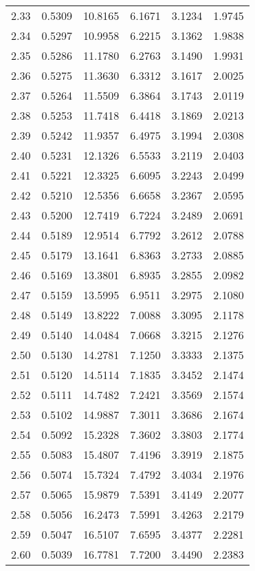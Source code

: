 \documentclass{article}
\begin{document}
\begin{longtable}{cccccc}
2.33 & 0.5309 & 10.8165 & 6.1671 & 3.1234 & 1.9745 \\
2.34 & 0.5297 & 10.9958 & 6.2215 & 3.1362 & 1.9838 \\
2.35 & 0.5286 & 11.1780 & 6.2763 & 3.1490 & 1.9931 \\
2.36 & 0.5275 & 11.3630 & 6.3312 & 3.1617 & 2.0025 \\
2.37 & 0.5264 & 11.5509 & 6.3864 & 3.1743 & 2.0119 \\
2.38 & 0.5253 & 11.7418 & 6.4418 & 3.1869 & 2.0213 \\
2.39 & 0.5242 & 11.9357 & 6.4975 & 3.1994 & 2.0308 \\
2.40 & 0.5231 & 12.1326 & 6.5533 & 3.2119 & 2.0403 \\
2.41 & 0.5221 & 12.3325 & 6.6095 & 3.2243 & 2.0499 \\
2.42 & 0.5210 & 12.5356 & 6.6658 & 3.2367 & 2.0595 \\
2.43 & 0.5200 & 12.7419 & 6.7224 & 3.2489 & 2.0691 \\
2.44 & 0.5189 & 12.9514 & 6.7792 & 3.2612 & 2.0788 \\
2.45 & 0.5179 & 13.1641 & 6.8363 & 3.2733 & 2.0885 \\
2.46 & 0.5169 & 13.3801 & 6.8935 & 3.2855 & 2.0982 \\
2.47 & 0.5159 & 13.5995 & 6.9511 & 3.2975 & 2.1080 \\
2.48 & 0.5149 & 13.8222 & 7.0088 & 3.3095 & 2.1178 \\
2.49 & 0.5140 & 14.0484 & 7.0668 & 3.3215 & 2.1276 \\
2.50 & 0.5130 & 14.2781 & 7.1250 & 3.3333 & 2.1375 \\
2.51 & 0.5120 & 14.5114 & 7.1835 & 3.3452 & 2.1474 \\
2.52 & 0.5111 & 14.7482 & 7.2421 & 3.3569 & 2.1574 \\
2.53 & 0.5102 & 14.9887 & 7.3011 & 3.3686 & 2.1674 \\
2.54 & 0.5092 & 15.2328 & 7.3602 & 3.3803 & 2.1774 \\
2.55 & 0.5083 & 15.4807 & 7.4196 & 3.3919 & 2.1875 \\
2.56 & 0.5074 & 15.7324 & 7.4792 & 3.4034 & 2.1976 \\
2.57 & 0.5065 & 15.9879 & 7.5391 & 3.4149 & 2.2077 \\
2.58 & 0.5056 & 16.2473 & 7.5991 & 3.4263 & 2.2179 \\
2.59 & 0.5047 & 16.5107 & 7.6595 & 3.4377 & 2.2281 \\
2.60 & 0.5039 & 16.7781 & 7.7200 & 3.4490 & 2.2383 \\

\end{longtable}
\end{document}

